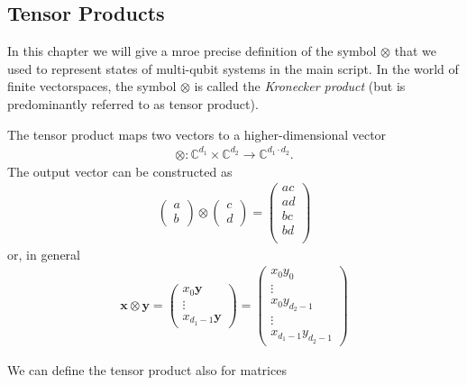 \subsection{Tensor Products}
In this chapter we will give a mroe precise definition of the symbol $\otimes$ that we used to represent states of multi-qubit systems in the main script. In the world of finite vectorspaces, the symbol $\otimes$ is called the \textit{Kronecker product} (but is predominantly referred to as tensor product). 
\begin{def*} The tensor product maps two vectors to a higher-dimensional vector
\begin{align}
    \otimes: \mathbb{C}^{d_1} \times \mathbb{C}^{d_2} \rightarrow \mathbb{C}^{d_1\cdot d_2}.
\end{align} 
The output vector can be constructed as
\begin{align}
    \begin{pmatrix}
        a\\b
    \end{pmatrix}
    \otimes 
    \begin{pmatrix}
        c\\d
    \end{pmatrix}
    = \begin{pmatrix}
        a c \\
        a d \\
        b c \\
        b d \\
    \end{pmatrix}
\end{align}
or, in general
\begin{align}
    \mathbf{x} \otimes \mathbf{y} = \begin{pmatrix}
        x_0 \mathbf{y} \\
        \vdots \\
        x_{d_1-1} \mathbf{y} 
    \end{pmatrix} = \begin{pmatrix}
        x_0 y_0\\
        \vdots \\
        x_0 y_{d_2-1}\\
        \vdots\\
        x_{d_1-1} y_{d_2-1}
    \end{pmatrix}
\end{align}
\end{def*}
We can define the tensor product also for matrices
